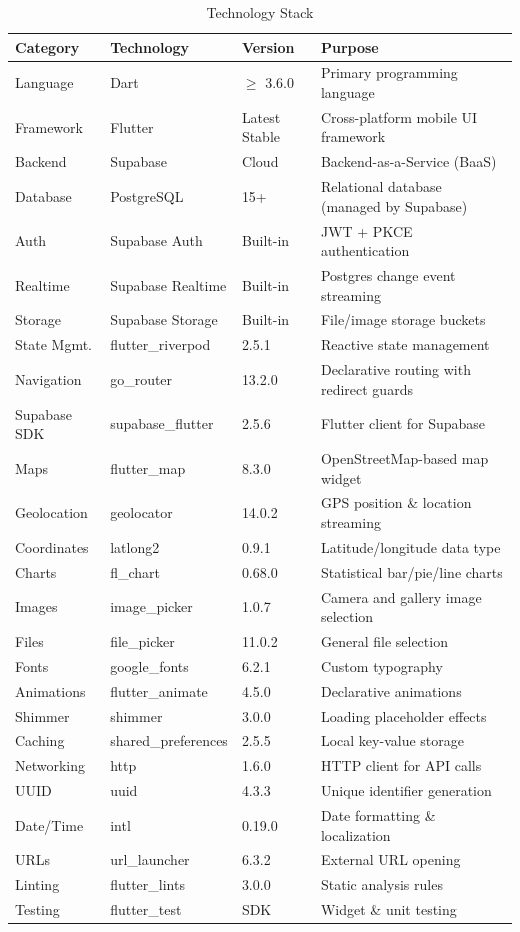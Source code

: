 \documentclass[11pt, a4paper]{report}
\begin{document}
\begin{table}[ht]
\centering
\caption{Technology Stack}
\label{tab:techstack}
\begin{tabularx}{\textwidth}{lllX}
\toprule
\textbf{Category} & \textbf{Technology} & \textbf{Version} & \textbf{Purpose} \\
\midrule
Language & Dart & $\geq$ 3.6.0 & Primary programming language \\
Framework & Flutter & Latest Stable & Cross-platform mobile UI framework \\
\addlinespace
Backend & Supabase & Cloud & Backend-as-a-Service (BaaS) \\
Database & PostgreSQL & 15+ & Relational database (managed by Supabase) \\
Auth & Supabase Auth & Built-in & JWT + PKCE authentication \\
Realtime & Supabase Realtime & Built-in & Postgres change event streaming \\
Storage & Supabase Storage & Built-in & File/image storage buckets \\
\addlinespace
State Mgmt. & flutter\_riverpod & 2.5.1 & Reactive state management \\
Navigation & go\_router & 13.2.0 & Declarative routing with redirect guards \\
Supabase SDK & supabase\_flutter & 2.5.6 & Flutter client for Supabase \\
\addlinespace
Maps & flutter\_map & 8.3.0 & OpenStreetMap-based map widget \\
Geolocation & geolocator & 14.0.2 & GPS position \& location streaming \\
Coordinates & latlong2 & 0.9.1 & Latitude/longitude data type \\
\addlinespace
Charts & fl\_chart & 0.68.0 & Statistical bar/pie/line charts \\
Images & image\_picker & 1.0.7 & Camera and gallery image selection \\
Files & file\_picker & 11.0.2 & General file selection \\
\addlinespace
Fonts & google\_fonts & 6.2.1 & Custom typography \\
Animations & flutter\_animate & 4.5.0 & Declarative animations \\
Shimmer & shimmer & 3.0.0 & Loading placeholder effects \\
\addlinespace
Caching & shared\_preferences & 2.5.5 & Local key-value storage \\
Networking & http & 1.6.0 & HTTP client for API calls \\
UUID & uuid & 4.3.3 & Unique identifier generation \\
Date/Time & intl & 0.19.0 & Date formatting \& localization \\
URLs & url\_launcher & 6.3.2 & External URL opening \\
\addlinespace
Linting & flutter\_lints & 3.0.0 & Static analysis rules \\
Testing & flutter\_test & SDK & Widget \& unit testing \\
\bottomrule
\end{tabularx}
\end{table}
\end{document}
